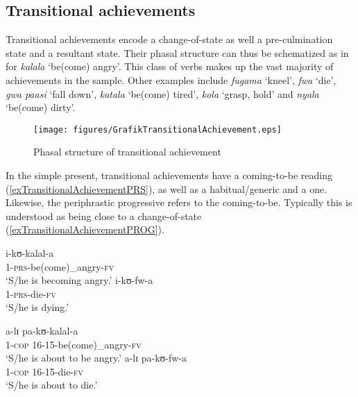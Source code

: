 \subsection{Transitional achievements}\label{VerbalClassTransitionalAchievement}
Transitional achievements encode a change-of-state as well a pre-culmination state and a resultant state. Their phasal structure can thus be schematized as in  for \textit{kalala} `be(come) angry'. This class of verbs makes up the vast majority of achievements in the sample. Other examples include \textit{fugama} \lq kneel', \textit{fwa} `die', \textit{gwa paasi} \lq fall down', \textit{katala} `be(come) tired', \textit{kola} \lq grasp, hold' and \textit{nyala} \lq be(come) dirty'.

\begin{figure}[h]
\begin{center}
\texttt{[image: figures/GrafikTransitionalAchievement.eps]}
\caption{Phasal structure of transitional achievement}
\label{FigureTransitionalAchievement}
\end{center}
\end{figure}

In the simple present, transitional achievements have a coming-to-be reading (\ref{exTransitionalAchievementPRS}), as well as a habitual/generic and a  one. Likewise, the periphrastic progressive refers to the coming-to-be. Typically this is understood as being close to a change-of-state (\ref{exTransitionalAchievementPROG}).
\begin{exe}
\begin{multicols}{2}
\ex\label{exTransitionalAchievementPRS} \begin{xlist}
\ex \gll i-kʊ-kalal-a\\
1-\textsc{prs}-be(come)\_angry-\textsc{fv} \phantom{16-15}\\
\glt `S/he is becoming angry.'
\ex \gll i-kʊ-fw-a\\
1-\textsc{prs}-die-\textsc{fv}\\
\glt `S/he is dying.'
\end{xlist}
\columnbreak
\ex\label{exTransitionalAchievementPROG} \begin{xlist}
\ex \gll a-lɪ pa-kʊ-kalal-a\\
1-\textsc{cop} 16-15-be(come)\_angry-\textsc{fv}\\
\glt `S/he is about to be angry.'
\ex \gll a-lɪ pa-kʊ-fw-a\\
1-\textsc{cop} 16-15-die-\textsc{fv}\\
\glt `S/he is about to die.'
\end{xlist}
\end{multicols} 
\end{exe}%


